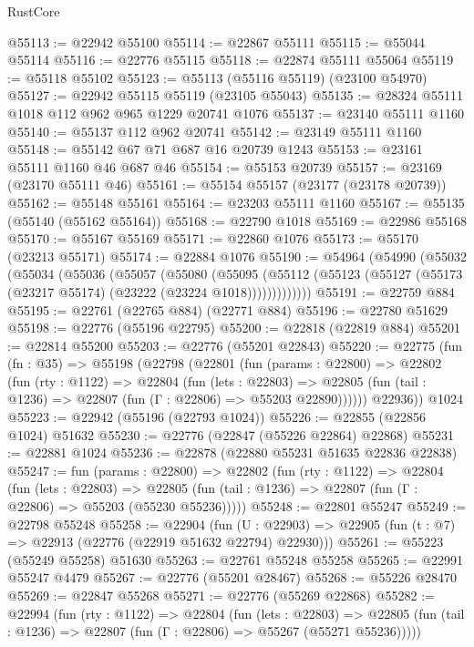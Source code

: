\begin{lexlean}{RustCore}
\begin{coremodule}
@55113 := @22942 @55100
@55114 := @22867 @55111
@55115 := @55044 @55114
@55116 := @22776 @55115
@55118 := @22874 @55111 @55064
@55119 := @55118 @55102
@55123 := @55113 (@55116 @55119) (@23100 @54970)
@55127 := @22942 @55115 @55119 (@23105 @55043)
@55135 := @28324 @55111 @1018 @112 @962 @965 @1229 @20741 @1076
@55137 := @23140 @55111 @1160
@55140 := @55137 @112 @962 @20741
@55142 := @23149 @55111 @1160
@55148 := @55142 @67 @71 @687 @16 @20739 @1243
@55153 := @23161 @55111 @1160 @46 @687 @46
@55154 := @55153 @20739
@55157 := @23169 (@23170 @55111 @46)
@55161 := @55154 @55157 (@23177 (@23178 @20739))
@55162 := @55148 @55161
@55164 := @23203 @55111 @1160
@55167 := @55135 (@55140 (@55162 @55164))
@55168 := @22790 @1018
@55169 := @22986 @55168
@55170 := @55167 @55169
@55171 := @22860 @1076
@55173 := @55170 (@23213 @55171)
@55174 := @22884 @1076
@55190 := @54964
    (@54990
      (@55032
        (@55034
          (@55036
            (@55057
              (@55080
                (@55095
                  (@55112 (@55123 (@55127 (@55173 (@23217 @55174) (@23222 (@23224 @1018)))))))))))))
@55191 := @22759 @884
@55195 := @22761 (@22765 @884) (@22771 @884)
@55196 := @22780 @51629
@55198 := @22776 (@55196 @22795)
@55200 := @22818 (@22819 @884)
@55201 := @22814 @55200
@55203 := @22776 (@55201 @22843)
@55220 := @22775
    (fun (fn : @35) =>
    @55198
      (@22798
        (@22801
          (fun (params : @22800) =>
          @22802
            (fun (rty : @1122) =>
            @22804
              (fun (lets : @22803) =>
              @22805 (fun (tail : @1236) => @22807 (fun (Γ : @22806) => @55203 @22890))))))
        @22936))
    @1024
@55223 := @22942 (@55196 (@22793 @1024))
@55226 := @22855 (@22856 @1024) @51632
@55230 := @22776 (@22847 (@55226 @22864) @22868)
@55231 := @22881 @1024
@55236 := @22878 (@22880 @55231 @51635 @22836 @22838)
@55247 := fun (params : @22800) =>
  @22802
    (fun (rty : @1122) =>
    @22804
      (fun (lets : @22803) =>
      @22805 (fun (tail : @1236) => @22807 (fun (Γ : @22806) => @55203 (@55230 @55236)))))
@55248 := @22801 @55247
@55249 := @22798 @55248
@55258 := @22904
    (fun (U : @22903) => @22905 (fun (t : @7) => @22913 (@22776 (@22919 @51632 @22794) @22930)))
@55261 := @55223 (@55249 @55258) @51630
@55263 := @22761 @55248 @55258
@55265 := @22991 @55247 @4479
@55267 := @22776 (@55201 @28467)
@55268 := @55226 @28470
@55269 := @22847 @55268
@55271 := @22776 (@55269 @22868)
@55282 := @22994
    (fun (rty : @1122) =>
    @22804
      (fun (lets : @22803) =>
      @22805 (fun (tail : @1236) => @22807 (fun (Γ : @22806) => @55267 (@55271 @55236)))))

\end{coremodule}
\end{lexlean}
